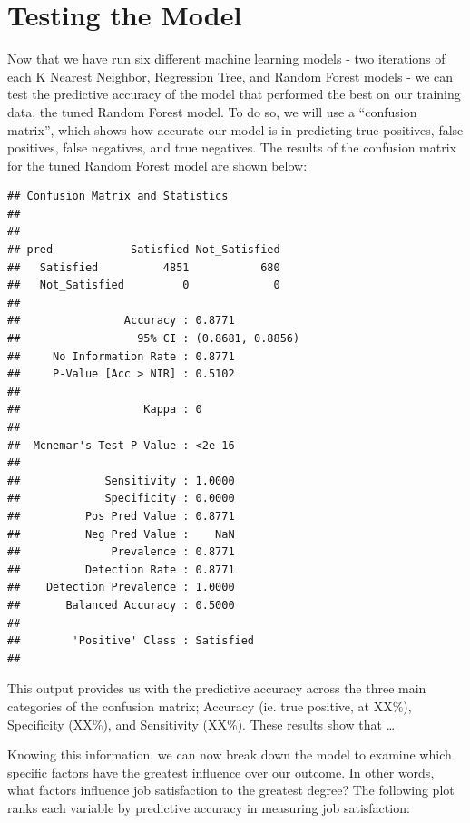 \documentclass[]{article}
\begin{document}
\section{Testing the Model}\label{testing-the-model}

Now that we have run six different machine learning models - two
iterations of each K Nearest Neighbor, Regression Tree, and Random
Forest models - we can test the predictive accuracy of the model that
performed the best on our training data, the tuned Random Forest model.
To do so, we will use a ``confusion matrix'', which shows how accurate
our model is in predicting true positives, false positives, false
negatives, and true negatives. The results of the confusion matrix for
the tuned Random Forest model are shown below:

\begin{verbatim}
## Confusion Matrix and Statistics
## 
##                
## pred            Satisfied Not_Satisfied
##   Satisfied          4851           680
##   Not_Satisfied         0             0
##                                           
##                Accuracy : 0.8771          
##                  95% CI : (0.8681, 0.8856)
##     No Information Rate : 0.8771          
##     P-Value [Acc > NIR] : 0.5102          
##                                           
##                   Kappa : 0               
##                                           
##  Mcnemar's Test P-Value : <2e-16          
##                                           
##             Sensitivity : 1.0000          
##             Specificity : 0.0000          
##          Pos Pred Value : 0.8771          
##          Neg Pred Value :    NaN          
##              Prevalence : 0.8771          
##          Detection Rate : 0.8771          
##    Detection Prevalence : 1.0000          
##       Balanced Accuracy : 0.5000          
##                                           
##        'Positive' Class : Satisfied       
## 
\end{verbatim}

This output provides us with the predictive accuracy across the three
main categories of the confusion matrix; Accuracy (ie. true positive, at
XX\%), Specificity (XX\%), and Sensitivity (XX\%). These results show
that \ldots{}

Knowing this information, we can now break down the model to examine
which specific factors have the greatest influence over our outcome. In
other words, what factors influence job satisfaction to the greatest
degree? The following plot ranks each variable by predictive accuracy in
measuring job satisfaction:
\end{document}
